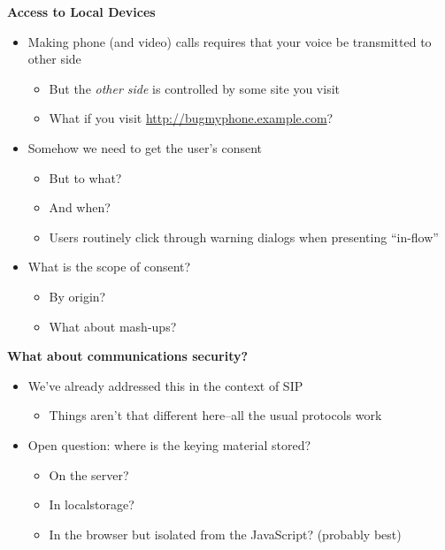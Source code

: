 \documentclass[helvetica]{seminar}
\newcommand{\heading}[1]{%
  \begin{center} 
    \large\bf 
    #1 
  \end{center} 
  \vspace{.4 in}}
\begin{document}
\begin{slide}
\heading{Access to Local Devices}

\vspace{-.2in}

\begin{itemize}
\item Making phone (and video) calls requires that your voice be transmitted to other side
  \begin{itemize}
  \item But the \emph{other side} is controlled by some site you visit
  \item What if you visit \url{http://bugmyphone.example.com}?
  \end{itemize}

\item Somehow we need to get the user's consent
  \begin{itemize}
  \item But to what?
  \item And when?
  \item Users routinely click through warning dialogs when presenting ``in-flow''
  \end{itemize}

\item What is the scope of consent?
  \begin{itemize}
  \item By origin?
  \item What about mash-ups?
  \end{itemize}
  

\end{itemize}
\end{slide}


\begin{slide}
\heading{What about communications security?}

\begin{itemize}
\item We've already addressed this in the context of SIP
  \begin{itemize}
  \item Things aren't that different here--all the usual protocols work
  \end{itemize}

\item Open question: where is the keying material stored?
  \begin{itemize}
  \item On the server?
  \item In localstorage?
  \item In the browser but isolated from the JavaScript? (probably best)
  \end{itemize}
  
\end{itemize}

\end{slide}




\begin{slide}
\scriptsize{


}
\end{slide}
\end{document}
